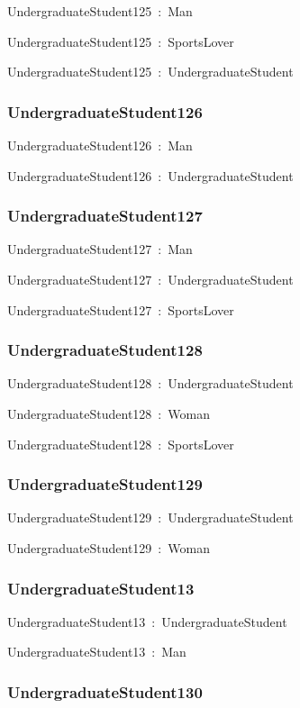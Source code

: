 \documentclass{article}
\begin{document}
UndergraduateStudent125~:~Man

UndergraduateStudent125~:~SportsLover

UndergraduateStudent125~:~UndergraduateStudent

\subsubsection*{UndergraduateStudent126}

UndergraduateStudent126~:~Man

UndergraduateStudent126~:~UndergraduateStudent

\subsubsection*{UndergraduateStudent127}

UndergraduateStudent127~:~Man

UndergraduateStudent127~:~UndergraduateStudent

UndergraduateStudent127~:~SportsLover

\subsubsection*{UndergraduateStudent128}

UndergraduateStudent128~:~UndergraduateStudent

UndergraduateStudent128~:~Woman

UndergraduateStudent128~:~SportsLover

\subsubsection*{UndergraduateStudent129}

UndergraduateStudent129~:~UndergraduateStudent

UndergraduateStudent129~:~Woman

\subsubsection*{UndergraduateStudent13}

UndergraduateStudent13~:~UndergraduateStudent

UndergraduateStudent13~:~Man

\subsubsection*{UndergraduateStudent130}
\end{document}
